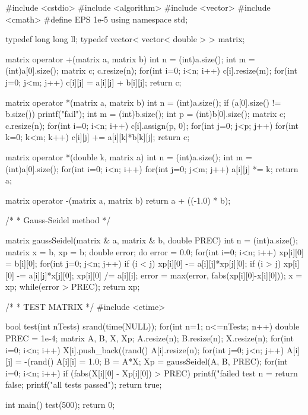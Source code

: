 \documentclass[11pt]{article}
\begin{document}
\begingroup\scriptsize
\begin{vncode}
#include <cstdio>
#include <algorithm>
#include <vector>
#include <cmath>
#define EPS 1e-5
using namespace std;

typedef long long ll;
typedef vector< vector< double > > matrix;

matrix operator +(matrix a, matrix b) {
	int n = (int)a.size();
	int m = (int)a[0].size();
	matrix c;
	c.resize(n);
	for(int i=0; i<n; i++) {
		c[i].resize(m);
		for(int j=0; j<m; j++) {
			c[i][j] = a[i][j] + b[i][j];
		}
	}
	return c;
}

matrix operator *(matrix a, matrix b) {
	int n = (int)a.size();
	if (a[0].size() != b.size()) printf("fail\n");
	int m = (int)b.size();
	int p = (int)b[0].size();
	matrix c;
	c.resize(n);
	for(int i=0; i<n; i++) {
		c[i].assign(p, 0);
		for(int j=0; j<p; j++) {
			for(int k=0; k<m; k++) {
				c[i][j] += a[i][k]*b[k][j];
			}
		}
	}
	return c;
}

matrix operator *(double k, matrix a) {
	int n = (int)a.size();
	int m = (int)a[0].size();
	for(int i=0; i<n; i++) {
		for(int j=0; j<m; j++) {
			a[i][j] *= k;
		}
	}
	return a;
}

matrix operator -(matrix a, matrix b) {
	return a + ((-1.0) * b);
}

/*
 * Gauss-Seidel method
 */

matrix gaussSeidel(matrix & a, matrix & b, double PREC) {
	int n = (int)a.size();
	matrix x = b, xp = b;
	double error;
	do {
		error = 0.0;
		for(int i=0; i<n; i++) {
			xp[i][0] = b[i][0];
			for(int j=0; j<n; j++) {
				if (i < j) xp[i][0] -= a[i][j]*xp[j][0];
				if (i > j) xp[i][0] -= a[i][j]*x[j][0];
			}
			xp[i][0] /= a[i][i];
			error = max(error, fabs(xp[i][0]-x[i][0]));
		}
		x = xp;
	} while(error > PREC);
	return xp;
}

/*
 * TEST MATRIX
 */
#include <ctime>

bool test(int nTests) {
	srand(time(NULL));
	for(int n=1; n<=nTests; n++) {
		double PREC = 1e-4;
		matrix A, B, X, Xp;
		A.resize(n);
		B.resize(n);
		X.resize(n);
		for(int i=0; i<n; i++) {
			X[i].push_back((rand()%
			A[i].resize(n);
			for(int j=0; j<n; j++) {
				A[i][j] = -(rand()%
			}
			A[i][i] = 1.0;
		}
		B = A*X;
		Xp = gaussSeidel(A, B, PREC);
		for(int i=0; i<n; i++) {
			if (fabs(X[i][0] - Xp[i][0]) > PREC) {
				printf("failed test n = %
				return false;
			}
		}
	}
	printf("all tests passed\n");
	return true;
}

int main() {
	test(500);
	return 0;
}
\end{vncode}
\endgroup
\end{document}
